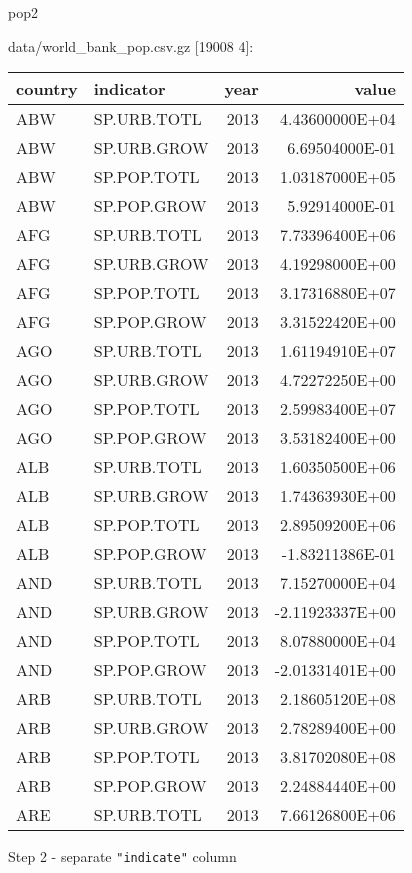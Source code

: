 \documentclass[]{article}
\newenvironment{Shaded}{\begin{snugshade}}{\end{snugshade}}
\newcommand{\KeywordTok}[1]{\textcolor[rgb]{0.13,0.29,0.53}{\textbf{#1}}}
\newcommand{\StringTok}[1]{\textcolor[rgb]{0.31,0.60,0.02}{#1}}
\newcommand{\SpecialStringTok}[1]{\textcolor[rgb]{0.31,0.60,0.02}{#1}}
\newcommand{\FunctionTok}[1]{\textcolor[rgb]{0.00,0.00,0.00}{#1}}
\newcommand{\VariableTok}[1]{\textcolor[rgb]{0.00,0.00,0.00}{#1}}
\newcommand{\BuiltInTok}[1]{#1}
\newcommand{\NormalTok}[1]{#1}
\begin{document}
\begin{Shaded}
\begin{Highlighting}[]
\NormalTok{pop2}
\end{Highlighting}
\end{Shaded}

data/world\_bank\_pop.csv.gz {[}19008 4{]}:

\begin{longtable}[]{@{}llrr@{}}
\toprule
country & indicator & year & value\tabularnewline
\midrule
\endhead
ABW & SP.URB.TOTL & 2013 & 4.43600000E+04\tabularnewline
ABW & SP.URB.GROW & 2013 & 6.69504000E-01\tabularnewline
ABW & SP.POP.TOTL & 2013 & 1.03187000E+05\tabularnewline
ABW & SP.POP.GROW & 2013 & 5.92914000E-01\tabularnewline
AFG & SP.URB.TOTL & 2013 & 7.73396400E+06\tabularnewline
AFG & SP.URB.GROW & 2013 & 4.19298000E+00\tabularnewline
AFG & SP.POP.TOTL & 2013 & 3.17316880E+07\tabularnewline
AFG & SP.POP.GROW & 2013 & 3.31522420E+00\tabularnewline
AGO & SP.URB.TOTL & 2013 & 1.61194910E+07\tabularnewline
AGO & SP.URB.GROW & 2013 & 4.72272250E+00\tabularnewline
AGO & SP.POP.TOTL & 2013 & 2.59983400E+07\tabularnewline
AGO & SP.POP.GROW & 2013 & 3.53182400E+00\tabularnewline
ALB & SP.URB.TOTL & 2013 & 1.60350500E+06\tabularnewline
ALB & SP.URB.GROW & 2013 & 1.74363930E+00\tabularnewline
ALB & SP.POP.TOTL & 2013 & 2.89509200E+06\tabularnewline
ALB & SP.POP.GROW & 2013 & -1.83211386E-01\tabularnewline
AND & SP.URB.TOTL & 2013 & 7.15270000E+04\tabularnewline
AND & SP.URB.GROW & 2013 & -2.11923337E+00\tabularnewline
AND & SP.POP.TOTL & 2013 & 8.07880000E+04\tabularnewline
AND & SP.POP.GROW & 2013 & -2.01331401E+00\tabularnewline
ARB & SP.URB.TOTL & 2013 & 2.18605120E+08\tabularnewline
ARB & SP.URB.GROW & 2013 & 2.78289400E+00\tabularnewline
ARB & SP.POP.TOTL & 2013 & 3.81702080E+08\tabularnewline
ARB & SP.POP.GROW & 2013 & 2.24884440E+00\tabularnewline
ARE & SP.URB.TOTL & 2013 & 7.66126800E+06\tabularnewline
\bottomrule
\end{longtable}

Step 2 - separate \texttt{"indicate"} column

\begin{Shaded}
\end{Shaded}
\end{document}
